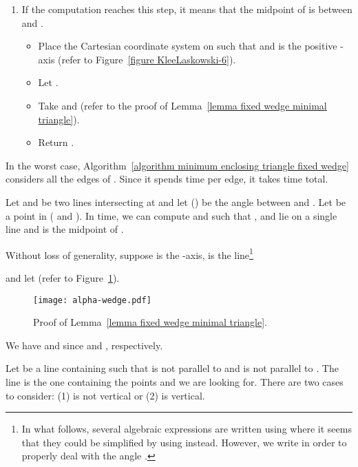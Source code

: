 \documentclass[11pt, oneside]{article}
\begin{document}
\begin{algorithm}
\begin{enumerate}
\item If the computation reaches this step,
it means that the midpoint of  is between  and .
\begin{itemize}
\item Place the Cartesian coordinate system on 
such that 
and  is the positive -axis
(refer to Figure~\ref{figure KleeLaskowski-6}).

\item Let .

\item Take  and 
(refer to the proof of Lemma~\ref{lemma fixed wedge minimal triangle}).

\item Return .
\end{itemize}
\end{enumerate}
\end{algorithm}
In the worst case,
Algorithm~\ref{algorithm minimum enclosing triangle fixed wedge} considers all the edges of .
Since it spends  time per edge,
it takes  time total.

\begin{lemma}
\label{lemma fixed wedge minimal triangle}
Let  and  be two lines
intersecting at 
and let  ()
be the angle between  and .
Let  be a point in 
( and ).
In  time,
we can compute 
and  such that
,  and  lie on a single line
and  is the midpoint of .
\end{lemma}

\proof
Without loss of generality,
suppose  is the -axis,
 is the line\footnote{
In what follows,
several algebraic expressions are written using 
where it seems that they could be simplified by using  instead.
However,
we write  in order to 
properly deal with the angle .} 

and let 
(refer to Figure~\ref{fig alpha-wedge}).
\begin{figure}
\centering
\texttt{[image: alpha-wedge.pdf]}
\caption{Proof of Lemma~\ref{lemma fixed wedge minimal triangle}.\label{fig alpha-wedge}}
\end{figure}
We have  and 
since  and ,
respectively.

Let  be a line containing  such that
 is not parallel to 
and  is not parallel to .
The line  is the one containing the points
 and  we are looking for.
There are two cases to consider:
(1)  is not vertical
or (2)  is vertical.
\end{document}
